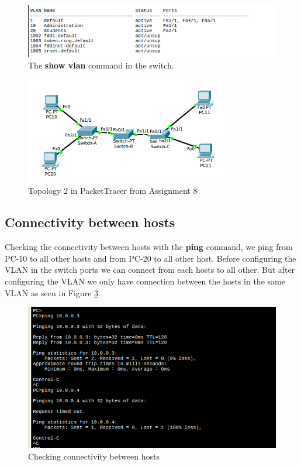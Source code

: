 \documentclass{article}
\begin{document}
\begin{figure}[h]
    \centering
    \includegraphics[scale=0.5]{2showvlan}
    \caption{The \textbf{show vlan} command in the switch.}
    \label{fig:2showvlan}
\end{figure}

\begin{figure}
    \centering
    \includegraphics[scale=0.3,width=0.8\textwidth]{topology2-config}
    \caption{Topology 2 in PacketTracer from Assignment 8}
    \label{fig:topology2-config}
\end{figure}

\subsection{Connectivity between hosts}

Checking the connectivity between hosts with the \textbf{ping} command, we ping from PC-10 to all other hosts and from PC-20 to all other host. Before configuring the VLAN in the switch ports we can connect from each hosts to all other. But after configuring the VLAN we only have connection between the hosts in the same VLAN as seen in Figure \ref{fig:2ping}.

\begin{figure}[h]
    \centering
    \includegraphics[scale=0.5]{2ping}
    \caption{Checking connectivity between hosts}
    \label{fig:2ping}
\end{figure}
\end{document}

